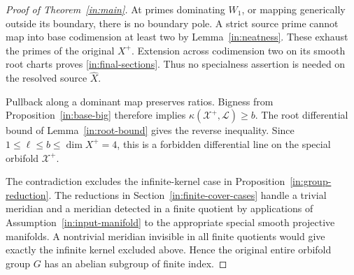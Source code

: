 \begin{proof}[Proof of Theorem~\ref{in:main}]
At primes dominating $W_1$, or mapping generically outside its
boundary, there is no boundary pole.  A strict source prime cannot
map into base codimension at least two by Lemma~\ref{in:neatness}.
These exhaust the primes of the original $X^+$.  Extension across
codimension two on its smooth root charts proves
\eqref{in:final-sections}.  Thus no specialness assertion is needed
on the resolved source $\widehat X$.

Pullback along a dominant map preserves ratios.  Bigness from
Proposition~\ref{in:base-big} therefore implies
$\kappa(\mathcal X^+,\mathcal L)\ge b$.  The root differential
bound of Lemma~\ref{in:root-bound} gives the reverse inequality.
Since $1\le\ell\le b\le\dim X^+=4$, this is a forbidden
differential line on the special orbifold $\mathcal X^+$.

The contradiction excludes the infinite-kernel case in
Proposition~\ref{in:group-reduction}.  The reductions in
Section~\ref{in:finite-cover-cases} handle a trivial meridian and a
meridian detected in a finite quotient by applications of
Assumption~\ref{in:input-manifold} to
the appropriate special smooth projective manifolds.  A nontrivial
meridian invisible in all finite quotients would give exactly the
infinite kernel excluded above.  Hence the original entire orbifold
group $G$ has an abelian subgroup of finite index.
\end{proof}

